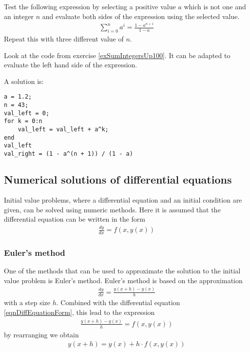 \begin{ex}
Test the following expression by selecting a positive value $a$
which is not one and an integer $n$
and evaluate both sides of the expression using the selected value.
\begin{align*}
\sum_{i = 0}^n a^i = \frac{1 - a^{n + 1}}{1 - a}
\end{align*}
Repeat this with three different value of $n$.
\begin{hint}
Look at the code from exercise \ref{exSumIntegersUp100}.
It can be adapted to evaluate the left hand side of the expression.
\end{hint}
\begin{sol}
A solution is:
\begin{lstlisting}
a = 1.2;
n = 43;
val_left = 0;
for k = 0:n
    val_left = val_left + a^k;
end
val_left
val_right = (1 - a^(n + 1)) / (1 - a)
\end{lstlisting}
\end{sol}
\end{ex}



\subsection{Numerical solutions of differential equations}

Initial value problems, where a differential equation and 
an initial condition are given, can be solved using numeric methods.
Here it is assumed that the differential equation can be 
written in the form
\begin{align}
\label{eqnDiffEquationForm}
\frac{dy}{dx} = f(x, y(x))
\end{align}

\subsubsection{Euler's method}
One of the methods that can be used to approximate the solution
to the initial value problem is Euler's method.
Euler's method is based on the approximation
\begin{align*}
\frac{dy}{dx} = \frac{y(x + h) - y(x)}{h}
\end{align*}
with a step size $h$.
Combined with the differential equation
\eqref{eqnDiffEquationForm}, this lead to the expression
\begin{align*}
\frac{y(x + h) - y(x)}{h} = f(x, y(x))
\end{align*}
by rearranging we obtain
\begin{align*}
y(x + h) = y(x) + h \cdot f(x, y(x))
\end{align*}

